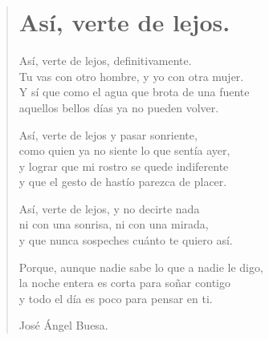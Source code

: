 \documentclass[11pt, portrait, twoside, notitlepage, openright]{book}
\begin{document}
\newpage
\begin{verse}
\begin{center}
\section{Así, verte de lejos.}
\end{center}

Así, verte de lejos, definitivamente.\\
Tu vas con otro hombre, y yo con otra mujer.\\
Y sí que como el agua que brota de una fuente\\
aquellos bellos días ya no pueden volver.
\newline

Así, verte de lejos y pasar sonriente,\\
como quien ya no siente lo que sentía ayer,\\
y lograr que mi rostro se quede indiferente\\
y que el gesto de hastío parezca de placer.
\newline

Así, verte de lejos, y no decirte nada\\
ni con una sonrisa, ni con una mirada,\\
y que nunca sospeches cuánto te quiero así.
\newline

Porque, aunque nadie sabe lo que a nadie le digo,\\
la noche entera es corta para soñar contigo\\
y todo el día es poco para pensar en ti.
\newline

José Ángel Buesa.
\end{verse}
\end{document}
